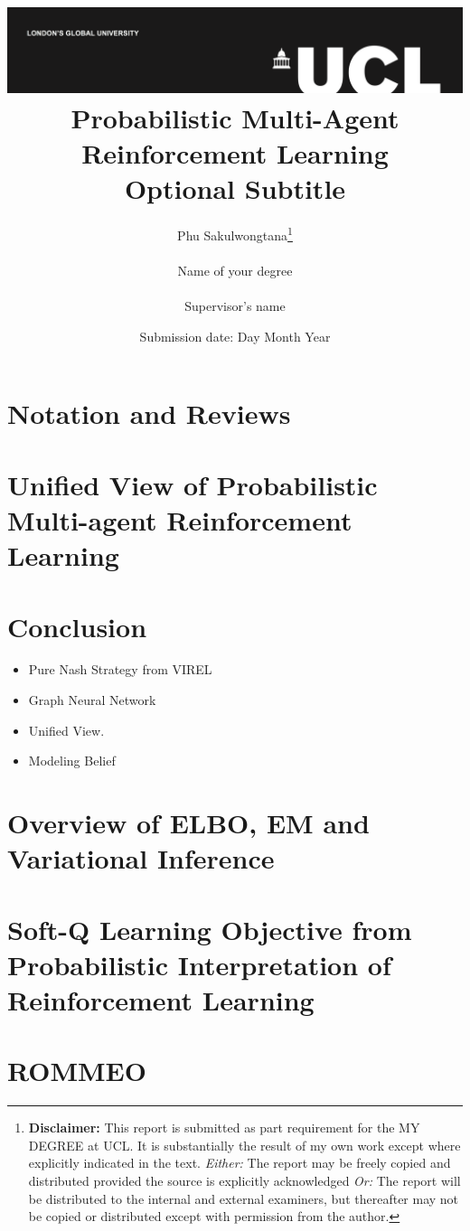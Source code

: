 \documentclass{report}
\title{{\vspace{-14em} \includegraphics[scale=0.4]{ucl_logo.png}}\\
{{\Huge Probabilistic Multi-Agent Reinforcement Learning}}\\
{\large Optional Subtitle}\\
}
\date{Submission date: Day Month Year}
\author{Phu Sakulwongtana\thanks{
{\bf Disclaimer:}
This report is submitted as part requirement for the MY DEGREE at UCL. It is
substantially the result of my own work except where explicitly indicated in the text.
\emph{Either:} The report may be freely copied and distributed provided the source is explicitly acknowledged
\newline  %
\emph{Or:}\newline
The report will be distributed to the internal and external examiners, but thereafter may not be copied or distributed except with permission from the author.}
\\ \\
Name of your degree\\ \\
Supervisor's name}
\begin{document}
 
\onehalfspacing
\maketitle
\begin{abstract}

\end{abstract}

\tableofcontents
\setcounter{page}{1}

\chapter{Notation and Reviews}


\chapter{Unified View of Probabilistic Multi-agent Reinforcement Learning}


\chapter{Conclusion}
\begin{itemize}
    \item Pure Nash Strategy from VIREL
    \item Graph Neural Network 
    \item Unified View. 
    \item Modeling Belief 
\end{itemize}

\appendix




\chapter{Overview of ELBO, EM and Variational Inference}


\chapter{Soft-Q Learning Objective from Probabilistic Interpretation of Reinforcement Learning}


\chapter{ROMMEO\cite{tian2019regularized}}\label{ROMMEOFull}

\end{document}
